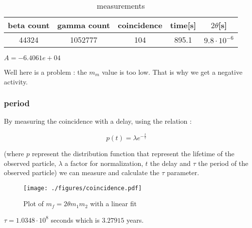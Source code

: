 \documentclass[a4paper,12pt,oneside]{article}
\def \be {\begin{equation}}
\def \ee {\end{equation}}
\begin{document}
	\begin{table}[h!]
	\centering
		\begin{tabular}{|c|c|c|c|c|}
			\hline
				beta count	&gamma count	&coincidence	&time[s] 	&$2\theta$[s]\\
			\hline
				44324		&1052777		&104			&895.1		&$9.8\cdot10^{-6}$\\
			\hline
		\end{tabular}
		\caption{measurements}
		\label{tab:poisson}
	\end{table}

	$A = -6.4061e+04 $

	Well here is a problem : the $m_m$ value is too low. That is why we get a negative activity.




	



\subsubsection{period}

	By measuring the coincidence with a delay, using the relation :

	\be
		p(t)= \lambda e^{-\frac{t}{\tau}}
	\ee

	(where $p$ represent the distribution function that represent the lifetime of the observed particle, $\lambda$ a factor for normalization, $t$ the delay and $\tau$ the period of the observed particle) we can measure and calculate the $\tau$ parameter. 


	\begin{figure}[h!]
		\begin{center}
		\texttt{[image: ./figures/coincidence.pdf]}
		\caption{Plot of $	m_f = 2\theta m_1 m_2$ with a linear fit} \label{fig:2theta}
		\end{center}
	\end{figure}


	$\tau = 1.0348 \cdot 10^8$ seconds which is $3.27915$ years.
\end{document}
